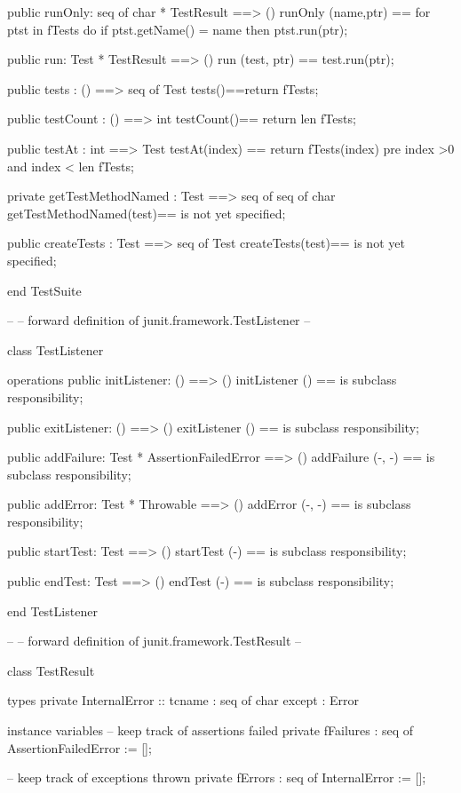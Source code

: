 \documentclass[a4paper]{article}
\begin{document}
\begin{vdm_al}
  public runOnly: seq of char * TestResult ==> ()
  runOnly (name,ptr) ==
  for ptst in fTests do
  if ptst.getName() = name then
 ptst.run(ptr);
  
  public run: Test * TestResult ==> ()
  run (test, ptr) == test.run(ptr);
      
    public tests : () ==> seq of Test
    tests()==return fTests;
    
    public testCount : () ==> int
    testCount()== return len fTests;
    
    public testAt : int ==> Test
    testAt(index) == return fTests(index)
    pre index >0 and index < len fTests;


  private getTestMethodNamed : Test ==> seq of seq of char
  getTestMethodNamed(test)== is not yet specified;

  public createTests : Test ==> seq of Test
  createTests(test)== is not yet specified;


end TestSuite

--
-- forward definition of junit.framework.TestListener
--

class TestListener

operations
  public initListener: () ==> ()
  initListener () == is subclass responsibility;
  
  public exitListener: () ==> ()
  exitListener () == is subclass responsibility;
  
  public addFailure: Test * AssertionFailedError ==> ()
  addFailure (-, -) == is subclass responsibility; 

  public addError: Test * Throwable ==> ()
  addError (-, -) == is subclass responsibility;
  
  public startTest: Test ==> ()
  startTest (-) == is subclass responsibility;
  
  public endTest: Test ==> ()
  endTest (-) == is subclass responsibility;
  
end TestListener

--
-- forward definition of junit.framework.TestResult
--

class TestResult

types
  private InternalError :: tcname : seq of char
                           except : Error
                   
instance variables
  -- keep track of assertions failed
  private fFailures : seq of AssertionFailedError := [];
  
  -- keep track of exceptions thrown
  private fErrors : seq of InternalError := [];
  

\end{vdm_al}
\end{document}
